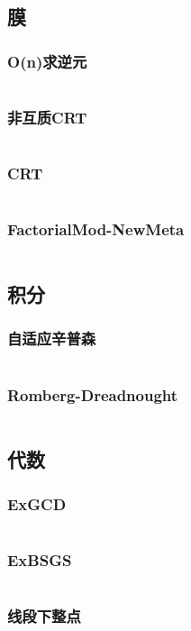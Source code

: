 \subsection{膜}
\subsubsection{O(n)求逆元}
\inputminted[breaklines]{cpp}{math/mod/inv.cpp}
\subsubsection{非互质CRT}
\inputminted[breaklines]{cpp}{math/mod/not-coprime-CRT.cpp}
\subsubsection{CRT}
\inputminted[breaklines]{cpp}{math/mod/CRT.cpp}
\subsubsection{FactorialMod-NewMeta}
\inputminted[breaklines]{cpp}{math/mod/}

\subsection{积分}
\subsubsection{自适应辛普森}
\inputminted[breaklines]{cpp}{math/integral/Simpson.cpp}
\subsubsection{Romberg-Dreadnought}
\inputminted[breaklines]{cpp}{math/integral/Romberg-Dreadnought.cpp}

\subsection{代数}
\subsubsection{ExGCD}
\inputminted[breaklines]{cpp}{math/algebra/EX-GCD.cpp}
\subsubsection{ExBSGS}
\inputminted[breaklines]{cpp}{math/algebra/EX-BSGS.cpp}
\subsubsection{线段下整点}
\inputminted[breaklines]{cpp}{math/algebra/integer-lattice-under-segment.cpp}
